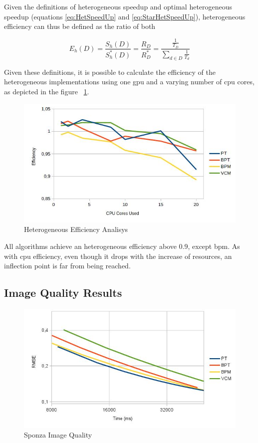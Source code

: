 Given the definitions of heterogeneous speedup and optimal heterogeneous speedup (equations \ref{eq:HetSpeedUp} and \ref{eq:StarHetSpeedUp}), heterogeneous efficiency can thus be defined as the ratio of both

\begin{equation}
E_h(D) = \frac{S_h(D)}{S_h^*(D)} = \frac{R_D}{R^*_D} = \frac{\frac{1}{T_D}}{\sum_{d \in D} \frac{1}{T_d}}
\label{eq:HetEff}
\end{equation}

Given these definitions, it is possible to calculate the efficiency of the heterogeneous implementations using one \gls{gpu} and a varying number of \gls{cpu} cores, as depicted in the figure ~\ref{img:hefficiency}.

\begin{figure}[H]
\centering
\includegraphics[width=0.8\linewidth]{img/hefficiency.jpg}
\caption{\label{img:hefficiency} Heterogeneous Efficiency Analisys}
\end{figure}

All algorithms achieve an heterogeneous efficiency above 0.9, except \gls{bpm}. As with \gls{cpu} efficiency, even though it drops with the increase of resources, an inflection point is far from being reached.

\subsection{Image Quality Results}

\begin{figure}[H]
\centering
\includegraphics[width=0.8\linewidth]{img/sponzaImgq.jpg}
\caption{\label{img:sponzaImgq} Sponza Image Quality}
\end{figure}

